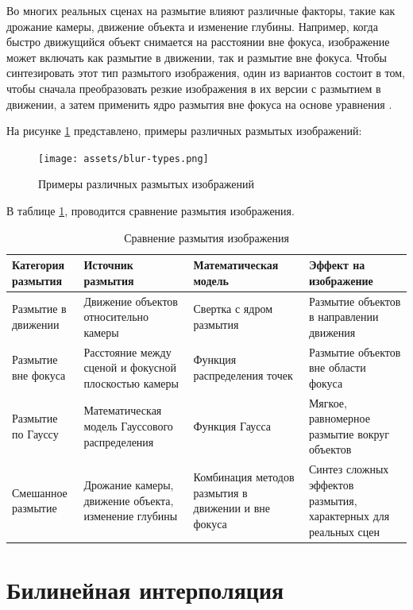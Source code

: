 Во многих реальных сценах на размытие влияют различные факторы, такие как дрожание камеры, движение объекта и изменение глубины. Например, когда быстро движущийся объект снимается на расстоянии вне фокуса, изображение может включать как размытие в движении, так и размытие вне фокуса. Чтобы синтезировать этот тип размытого изображения, один из вариантов состоит в том, чтобы сначала преобразовать резкие изображения в их версии с размытием в движении, а затем применить ядро размытия вне фокуса на основе уравнения \cite{zhang2020deblurring}.


На рисунке \ref{fig:blur-types} представлено, примеры различных размытых изображений:
\begin{figure}[H]
	\centering
	\texttt{[image: assets/blur-types.png]}
	\caption{Примеры различных размытых изображений}
	\label{fig:blur-types}
\end{figure}

В таблице \ref{tab:blur_comparison}, проводится сравнение размытия изображения.

\begin{table}[H]
    \centering
    \caption{Сравнение размытия изображения}
    \label{tab:blur_comparison}
    \begin{tabular}{|p{3cm}|p{4cm}|p{4cm}|p{4cm}|}
        \hline
        \textbf{Категория размытия} & \textbf{Источник размытия} & \textbf{Математическая модель} & \textbf{Эффект на изображение} \\ \hline
        Размытие в движении & Движение объектов относительно камеры & Свертка с ядром размытия & Размытие объектов в направлении движения \\ \hline
        Размытие вне фокуса & Расстояние между сценой и фокусной плоскостью камеры & Функция распределения точек & Размытие объектов вне области фокуса \\ \hline
        Размытие по Гауссу & Математическая модель Гауссового распределения & Функция Гаусса & Мягкое, равномерное размытие вокруг объектов \\ \hline
        Смешанное размытие & Дрожание камеры, движение объекта, изменение глубины & Комбинация методов размытия в движении и вне фокуса & Синтез сложных эффектов размытия, характерных для реальных сцен \\ \hline
    \end{tabular}
\end{table}

\section{Билинейная интерполяция}

